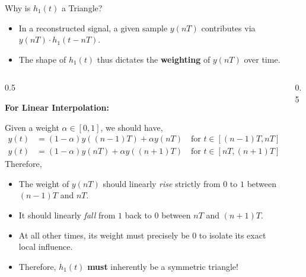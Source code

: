 \begin{frame}{Why is $h_1(t)$ a Triangle?}
  \begin{itemize}
    \item In a reconstructed signal, a given sample $y(nT)$ contributes via $y(nT) \cdot h_1(t - nT)$.
    \item The shape of $h_1(t)$ thus dictates the \textbf{weighting} of $y(nT)$ over time.
  \end{itemize}
  \vspace{0.2cm}
  \begin{columns}
    \begin{column}{0.5\textwidth}
      \footnotesize

      \textbf{For Linear Interpolation:}

      Given a weight $\alpha \in [0, 1]$, we should have,
      \begin{align*}
        y(t) & = (1 - \alpha) y((n-1)T) + \alpha y(nT) \quad \text{for } t \in [(n-1)T, nT] \\
        y(t) & = (1 - \alpha) y(nT) + \alpha y((n+1)T) \quad \text{for } t \in [nT, (n+1)T]
      \end{align*}
      Therefore,
      \begin{itemize}
        \item The weight of $y(nT)$ should linearly \textit{rise} strictly from $0$ to $1$ between $(n-1)T$ and $nT$.
        \item It should linearly \textit{fall} from $1$ back to $0$ between $nT$ and $(n+1)T$.
        \item At all other times, its weight must precisely be $0$ to isolate its exact local influence.
        \item Therefore, $h_1(t)$ \textbf{must} inherently be a symmetric triangle!
      \end{itemize}
    \end{column}
    \begin{column}{0.5\textwidth}
      \centering
\end{column}
\end{columns}
\end{frame}
